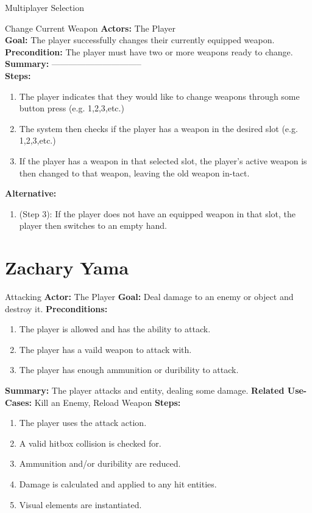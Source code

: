 \documentclass[12pt]{report}
\begin{document}
\begin{subsection}{Multiplayer Selection}
\begin{subsection}{Change Current Weapon}
\textbf{Actors:} The Player \\
\textbf{Goal:} The player successfully changes their currently equipped weapon. \\
\textbf{Precondition:} The player must have two or more weapons ready to change. \\
\textbf{Summary:} -------------------------------- \\
\textbf{Steps:}
\begin{enumerate}
	\item The player indicates that they would like to change weapons through some button press (e.g. 1,2,3,etc.)
	\item The system then checks if the player has a weapon in the desired slot (e.g. 1,2,3,etc.)
	\item If the player has a weapon in that selected slot, the player's active weapon is then changed to that weapon, leaving the old weapon in-tact.
\end{enumerate}
\textbf{Alternative:}
\begin{enumerate}
	\item (Step 3): If the player does not have an equipped weapon in that slot, the player then switches to an empty hand.
\end{enumerate}
\end{subsection}





\section{Zachary Yama}

\begin{subsection}{Attacking}
\textbf{Actor:} The Player
\textbf{Goal:} Deal damage to an enemy or object and destroy it.
\textbf{Preconditions:}
\begin{enumerate}
	\item The player is allowed and has the ability to attack.
	\item The player has a vaild weapon to attack with.
	\item The player has enough ammunition or duribility to attack.
\end{enumerate}
\textbf{Summary:} The player attacks and entity, dealing some damage.
\textbf{Related Use-Cases:} Kill an Enemy, Reload Weapon
\textbf{Steps:}
\begin{enumerate}
	\item The player uses the attack action.
	\item A valid hitbox collision is checked for.
	\item Ammunition and/or duribility are reduced.
	\item Damage is calculated and applied to any hit entities.
	\item Visual elements are instantiated.
\end{enumerate}
\end{subsection}


\end{subsection}
\end{document}
